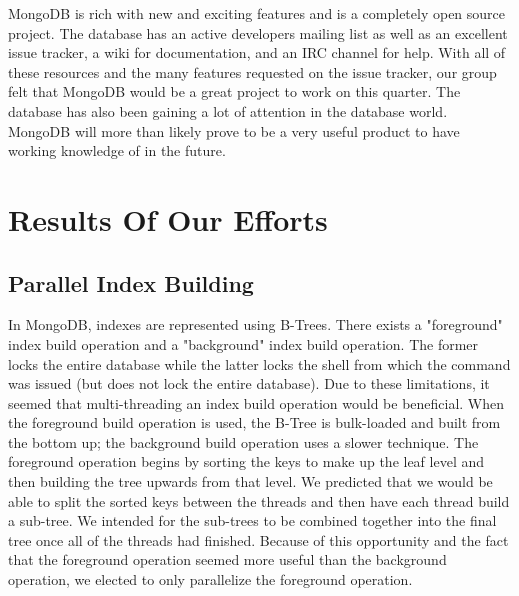 \documentclass{../dependencies/acm_proc_article-sp}
\begin{document}
MongoDB is rich with new and exciting features and is a completely open source project.
The database has an active developers mailing list as well as an excellent issue tracker,
a wiki for documentation, and an IRC channel for help. With all of these resources and
the many features requested on the issue tracker, our group felt that MongoDB would be a great
project to work on this quarter. The database has also been gaining a lot of attention in the
database world. MongoDB will more than likely prove to be a very useful product
to have working knowledge of in the future.


\section{Results Of Our Efforts}
\subsection{Parallel Index Building}
In MongoDB, indexes are represented using B-Trees.
There exists a "foreground" index build operation and a "background" index build operation.
The former locks the entire database while the latter locks the shell from which the command was issued (but does not lock the entire database).
Due to these limitations, it seemed that multi-threading an index build operation would be beneficial.
When the foreground build operation is used, the B-Tree is bulk-loaded and built from the bottom up; the background build operation uses a slower technique\cite{1}.
The foreground operation begins by sorting the keys to make up the leaf level and then building the tree upwards from that level.
We predicted that we would be able to split the sorted keys between the threads and then have each thread build a sub-tree.
We intended for the sub-trees to be combined together into the final tree once all of the threads had finished.
Because of this opportunity and the fact that the foreground operation seemed more useful than the background operation, we elected to only parallelize the foreground operation.
\end{document}
